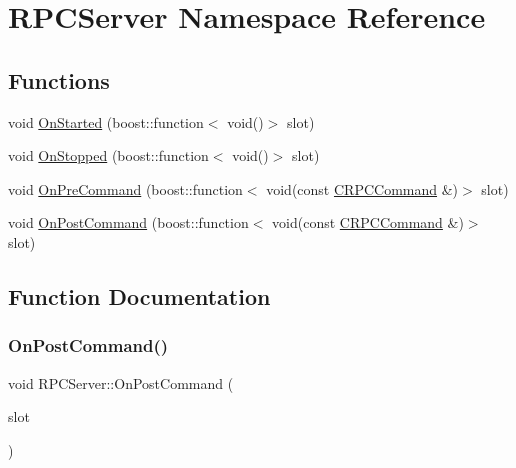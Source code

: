 \hypertarget{namespace_r_p_c_server}{}\section{R\+P\+C\+Server Namespace Reference}
\label{namespace_r_p_c_server}
\subsection*{Functions}
\begin{DoxyCompactItemize}
\item 
void \mbox{\hyperlink{namespace_r_p_c_server_a7c3a8e18df87039ee9c3ea4217b89b0c}{On\+Started}} (boost\+::function$<$ void()$>$ slot)
\item 
void \mbox{\hyperlink{namespace_r_p_c_server_a281edbc9eae581611c3f8d0278c9ab69}{On\+Stopped}} (boost\+::function$<$ void()$>$ slot)
\item 
void \mbox{\hyperlink{namespace_r_p_c_server_a6150327eb9a893eb202bd7f922e3529f}{On\+Pre\+Command}} (boost\+::function$<$ void(const \mbox{\hyperlink{class_c_r_p_c_command}{C\+R\+P\+C\+Command}} \&)$>$ slot)
\item 
void \mbox{\hyperlink{namespace_r_p_c_server_a6eb38e7ec2a577523d045502d5d750b2}{On\+Post\+Command}} (boost\+::function$<$ void(const \mbox{\hyperlink{class_c_r_p_c_command}{C\+R\+P\+C\+Command}} \&)$>$ slot)
\end{DoxyCompactItemize}


\subsection{Function Documentation}
\mbox{\label{namespace_r_p_c_server_a6eb38e7ec2a577523d045502d5d750b2}} 
\subsubsection{\texorpdfstring{On\+Post\+Command()}{OnPostCommand()}}
{\footnotesize\ttfamily void R\+P\+C\+Server\+::\+On\+Post\+Command (\begin{DoxyParamCaption}\item[{boost\+::function$<$ void(const \mbox{\hyperlink{class_c_r_p_c_command}{C\+R\+P\+C\+Command}} \&)$>$}]{slot }\end{DoxyParamCaption})}

